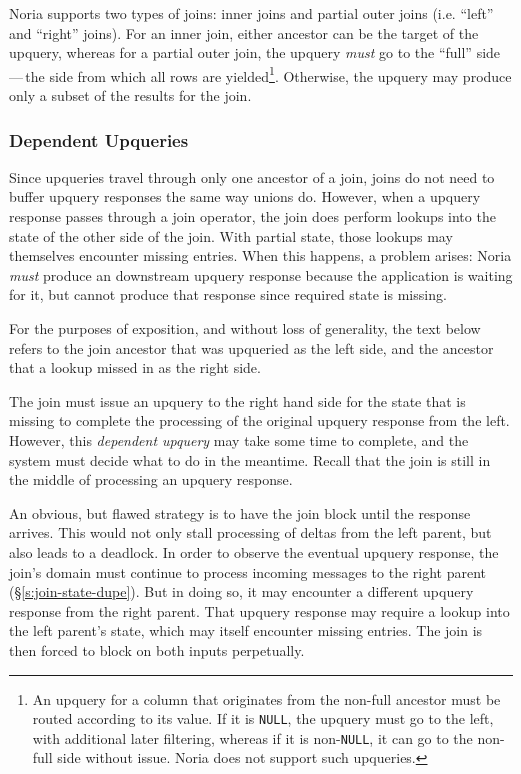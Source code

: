 Noria supports two types of joins: inner joins and partial outer joins (i.e.
``left'' and ``right'' joins). For an inner join, either ancestor can be the
target of the upquery, whereas for a partial outer join, the upquery \emph{must}
go to the ``full'' side\,---\,the side from which all rows are
yielded\footnote{An upquery for a column that originates from the non-full
ancestor must be routed according to its value. If it is \texttt{NULL}, the
upquery must go to the left, with additional later filtering, whereas if it is
non-\texttt{NULL}, it can go to the non-full side without issue. Noria does not
support such upqueries.}. Otherwise, the upquery may produce only a subset of
the results for the join.

\subsubsection{Dependent Upqueries}

Since upqueries travel through only one ancestor of a join, joins do not need to
buffer upquery responses the same way unions do. However, when a upquery
response passes through a join operator, the join does perform lookups into the
state of the other side of the join. With partial state, those lookups may
themselves encounter missing entries. When this happens, a problem arises: Noria
\emph{must} produce an downstream upquery response because the application is
waiting for it, but cannot produce that response since required state is
missing.

For the purposes of exposition, and without loss of generality, the text below
refers to the join ancestor that was upqueried as the left side, and the
ancestor that a lookup missed in as the right side.

The join must issue an upquery to the right hand side for the state that is
missing to complete the processing of the original upquery response from the
left. However, this \textit{dependent upquery} may take some time to complete,
and the system must decide what to do in the meantime. Recall that the join is
still in the middle of processing an upquery response.

An obvious, but flawed strategy is to have the join block until the response
arrives. This would not only stall processing of deltas from the left parent,
but also leads to a deadlock. In order to observe the eventual upquery response,
the join's domain must continue to process incoming messages to the right parent
(\S\ref{s:join-state-dupe}). But in doing so, it may encounter a different
upquery response from the right parent. That upquery response may require a
lookup into the left parent's state, which may itself encounter missing entries.
The join is then forced to block on both inputs perpetually.

